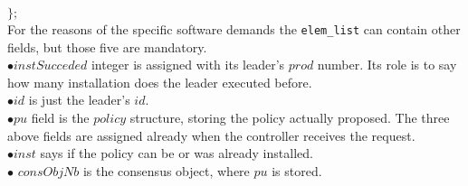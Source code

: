 \documentclass{article}
\begin{document}
$\rbrace ;$\\
For the reasons of the specific software demands the \texttt{elem\_list} can contain other fields, but those five are mandatory.\\
$\bullet instSucceded$ integer is assigned with its leader's $prod$ number. Its role is to say how many installation does the leader executed before. \\
$\bullet id$ is just the leader's $id$.\\
$\bullet pu$ field is the $policy$ structure, storing the policy actually proposed. The three above fields are assigned already when the controller receives the request.\\
$\bullet inst$ says if the policy can be or was already installed.\\
$\bullet$ $consObjNb$ is the consensus object, where $pu$ is stored.\\

\end{document}

